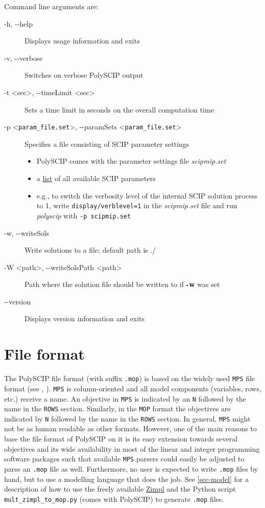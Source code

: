 \documentclass[11pt,listof=totoc]{scrartcl}
\theoremstyle{definition}
\begin{document}
Command line arguments are:
\begin{description}
\item[-h, -{}-help] Displays usage information and exits
\item[-v, -{}-verbose] Switches on verbose PolySCIP output
\item[-t <sec>, -{}-timeLimit <sec>] Sets a time limit in seconds on the overall computation time
\item[ -p <\texttt{param\_file.set}>, -{}-paramSets <\texttt{param\_file.set}>] Specifies a file consisting of SCIP parameter settings
\begin{itemize}
 \item PolySCIP comes with the parameter settings file \emph{scipmip.set}
 \item a \href{http://scip.zib.de/doc/html_devel/PARAMETERS.php}{list} of all available SCIP parameters
 \item e.g., to switch the verbosity level of the internal SCIP solution process to 1, write \texttt{display/verblevel=1} in the \emph{scipmip.set} file and run \emph{polyscip} with \texttt{-p scipmip.set}
\end{itemize}
\item[-w, -{}-writeSols] Write solutions to a file; default path is ./
\item[-W <path>, -{}-writeSolsPath <path>] Path where the solution file should be written to if \textbf{-w} was set
\item[-{}-version] Displays version information and exits
\end{description}

\section{File format}\label{sec-format}

The PolySCIP file format (with suffix \texttt{.mop}) is based on the
widely used \texttt{MPS} file format (see \cite{mps-format},
\cite{mps-format2}). \texttt{MPS} is column-oriented and all model
components (variables, rows, etc.)  receive a name. An objective in
\texttt{MPS} is indicated by an \texttt{N} followed by the name in the
\texttt{ROWS} section. Similarly, in the \texttt{MOP} format the
objectives are indicated by \texttt{N} followed by the name in the
\texttt{ROWS} section. In general, \texttt{MPS} might not be as human
readable as other formats. However, one of the main reasons to base
the file format of PolySCIP on it is its easy extension towards
several objectives and its wide availability in most of the linear and
integer programming software packages such that available \texttt{MPS}
parsers could easily be adjusted to parse an \texttt{.mop} file as
well. Furthermore, no user is expected to write \texttt{.mop} files by
hand, but to use a modelling language that does the job. See
\cref{sec-model} for a description of how to use the freely available
\href{http://zimpl.zib.de}{Zimpl} and the Python script
\texttt{mult\_zimpl\_to\_mop.py} (comes with PolySCIP) to generate
\texttt{.mop} files.
\end{document}
